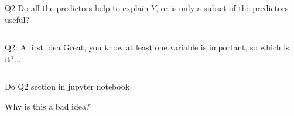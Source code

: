 \documentclass[aspectratio=169,usenames,dvipsnames]{beamer}
\newcommand{\InstructorList}[1]{
\begin{itemize}
	\color{orange}
	#1
\end{itemize}
}
\renewcommand{\InstructorList}[1]{}
\begin{document}
\begin{frame}

\begin{columns}
\centering
\begin{block}
	{Q2}
Do all the predictors help to explain $Y$, or is only a subset of the predictors useful?
\end{block}

\end{columns}

\end{frame}
\begin{frame}[t]{Q2: A first idea}
{Great, you know at least one variable is important, so which is it?....}
\begin{columns}
\centering
\InstructorList{
\item Bad idea plan A: All subsets or best subsets regression
	\InstructorList{
		\item Take every possible subset of $p$ variables
		\item Figure out least squares fit
		\item Choose the best one based on some criterion balancing training error with model size
	}
}
\centering
\end{columns}

\end{frame}
{
\begin{frame}[c]{}

	\centering 
	Do Q2 section in jupyter notebook 

\end{frame}
}

\begin{frame}[t]{Why is this a bad idea?}
\begin{columns}
\centering
\InstructorList{
\item Why bad idea: $p=40$ variables, this is checking more than a billion models
\item Better idea: Automated appbroach that searches the subsets for a good one without checking all of them
}
\centering
\InstructorList{
  \item Later in the class, we will discuss better options for this (Ch 6, $\sim$ a month from now)
  \item Forward selection/ Backward selection to get subsets of variables without checking every possible subset 
  \item Shrinkage methods (Lasso/Ridge)
}

\end{columns}
\end{frame}
\end{document}
